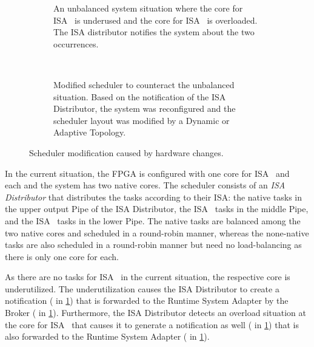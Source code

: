 \begin{figure}[!htp]
	\centering
	\begin{subfigure}[b]{0.95\textwidth}\centering
		\caption[An unbalanced system situation.]{An unbalanced system situation where the core for ISA~\textalpha{} is underused and the core for ISA~\textbeta{} is overloaded. The ISA distributor notifies the system about the two occurrences.}%
		\label{fig:feature:adapt1}
	\end{subfigure}
	\\ \vspace{0.25cm}
	\begin{subfigure}[b]{0.95\textwidth}\centering
		\caption[Modified scheduler to counteract the unbalanced situation.]{Modified scheduler to counteract the unbalanced situation. Based on the notification of the ISA Distributor, the system was reconfigured and the scheduler layout was modified by a Dynamic or Adaptive Topology.}%
		\label{fig:feature:adapt2}
	\end{subfigure}%
	\caption[Scheduler modification caused by hardware changes.]{Scheduler modification caused by hardware changes.}%
	\label{fig:feature:adapt}
\end{figure}

In the current situation, the \ac{FPGA} is configured with one core for \ac{ISA}~\textalpha{} and~\textbeta{} each and the system has two native cores. The scheduler consists of an \emph{ISA Distributor} that distributes the tasks according to their \ac{ISA}: the native tasks in the upper output Pipe of the ISA Distributor, the \ac{ISA}~\textalpha{} tasks in the middle Pipe, and the \ac{ISA}~\textbeta{} tasks in the lower Pipe. The native tasks are balanced among the two native cores and scheduled in a round-robin manner, whereas the none-native tasks are also scheduled in a round-robin manner but need no load-balancing as there is only one core for each.

As there are no tasks for \ac{ISA}~\textalpha{} in the current situation, the respective core is underutilized. The underutilization causes the ISA Distributor to create a notification ( in \cref{fig:feature:adapt1}) that is forwarded to the Runtime System Adapter by the \cobas{} Broker ( in \cref{fig:feature:adapt1}). Furthermore, the ISA Distributor detects an overload situation at the core for \ac{ISA}~\textbeta{} that causes it to generate a notification as well ( in \cref{fig:feature:adapt1}) that is also forwarded to the Runtime System Adapter ( in \cref{fig:feature:adapt1}).

